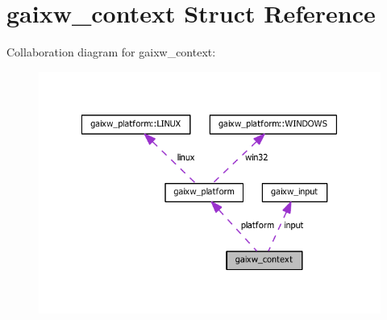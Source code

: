 \hypertarget{structgaixw__context}{}\section{gaixw\+\_\+context Struct Reference}
\label{structgaixw__context}


Collaboration diagram for gaixw\+\_\+context\+:
\nopagebreak
\begin{figure}[H]
\begin{center}
\leavevmode
\includegraphics[width=350pt]{structgaixw__context__coll__graph}
\end{center}
\end{figure}
